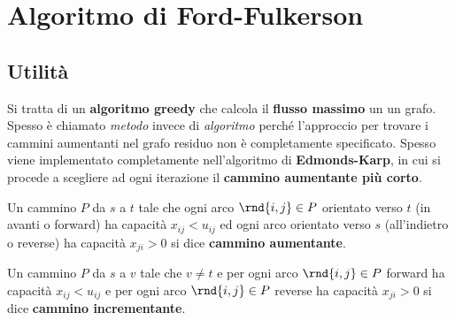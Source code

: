 \documentclass[\main/main.tex]{subfiles}
\begin{document}
\chapter{Algoritmo di Ford-Fulkerson}
\section{Utilità}
Si tratta di un \textbf{algoritmo greedy} che calcola il \textbf{flusso massimo} un un grafo. Spesso è chiamato \textit{metodo} invece di \textit{algoritmo} perché l'approccio per trovare i cammini aumentanti nel grafo residuo non è completamente specificato. Spesso viene implementato completamente nell'algoritmo di \textbf{Edmonds-Karp}, in cui si procede a scegliere ad ogni iterazione il \textbf{cammino aumentante più corto}.

\begin{definition}
  Un cammino \(P\) da \(s\) a \(t\) tale che ogni arco \(\rnd{i,j} \in P\) orientato verso \(t\) (in avanti o forward) ha capacità \(x_{ij}<u_{ij}\) ed ogni arco orientato verso \(s\) (all'indietro o reverse) ha capacità \(x_{ji} > 0\) si dice \textbf{cammino aumentante}.
\end{definition}

\begin{definition}
  Un cammino \(P\) da \(s\) a \(v\) tale che \(v \neq t\) e per ogni arco \(\rnd{i,j} \in P\) forward ha capacità \(x_{ij} < u_{ij}\) e per ogni arco \(\rnd{i,j} \in P\) reverse ha capacità \(x_{ji}>0\) si dice \textbf{cammino incrementante}.
\end{definition}
\end{document}
